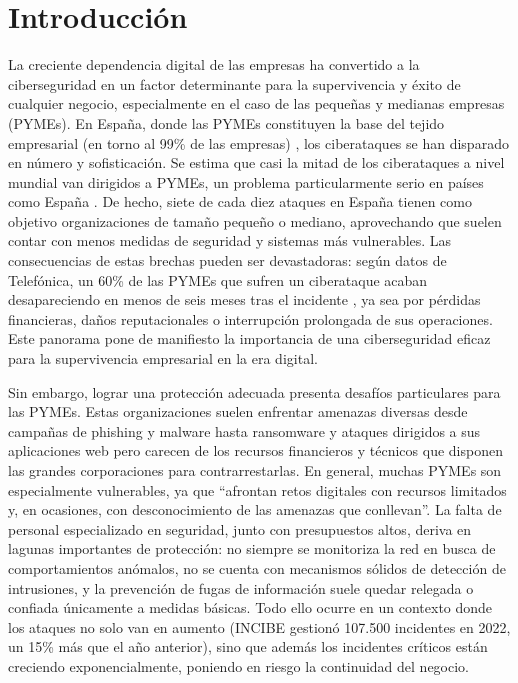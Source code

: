 \documentclass[11pt,a4paper,twoside]{report}
\begin{document}
\clearpage
\null
\thispagestyle{empty}
\newpage
\chapter*{Introducción}
\setcounter{secnumdepth}{0} %

La creciente dependencia digital de las empresas ha convertido a la ciberseguridad en un factor determinante para la supervivencia y éxito de cualquier negocio, especialmente en el caso de las pequeñas y medianas empresas (PYMEs). En España, donde las PYMEs constituyen la base del tejido empresarial (en torno al 99\% de las empresas) \cite{enisa2023}
, los ciberataques se han disparado en número y sofisticación. Se estima que casi la mitad de los ciberataques a nivel mundial van dirigidos a PYMEs, un problema particularmente serio en países como España \cite{google2024}. De hecho, siete de cada diez ataques en España tienen como objetivo organizaciones de tamaño pequeño o mediano, aprovechando que suelen contar con menos medidas de seguridad y sistemas más vulnerables. Las consecuencias de estas brechas pueden ser devastadoras: según datos de Telefónica, un 60\% de las PYMEs que sufren un ciberataque acaban desapareciendo en menos de seis meses tras el incidente \cite{telefonica2023}, ya sea por pérdidas financieras, daños reputacionales o interrupción prolongada de sus operaciones. Este panorama pone de manifiesto la importancia de una ciberseguridad eficaz para la supervivencia empresarial en la era digital.\newline

Sin embargo, lograr una protección adecuada presenta desafíos particulares para las PYMEs. Estas organizaciones suelen enfrentar amenazas diversas desde campañas de phishing y malware hasta ransomware y ataques dirigidos a sus aplicaciones web pero carecen de los recursos financieros y técnicos que disponen las grandes corporaciones para contrarrestarlas. En general, muchas PYMEs son especialmente vulnerables, ya que “afrontan retos digitales con recursos limitados y, en ocasiones, con desconocimiento de las amenazas que conllevan”. La falta de personal especializado en seguridad, junto con presupuestos altos, deriva en lagunas importantes de protección: no siempre se monitoriza la red en busca de comportamientos anómalos, no se cuenta con mecanismos sólidos de detección de intrusiones, y la prevención de fugas de información suele quedar relegada o confiada únicamente a medidas básicas. Todo ello ocurre en un contexto donde los ataques no solo van en aumento (INCIBE gestionó 107.500 incidentes en 2022, un 15\% más que el año anterior), sino que además los incidentes críticos están creciendo exponencialmente, poniendo en riesgo la continuidad del negocio.\newline
\end{document}
